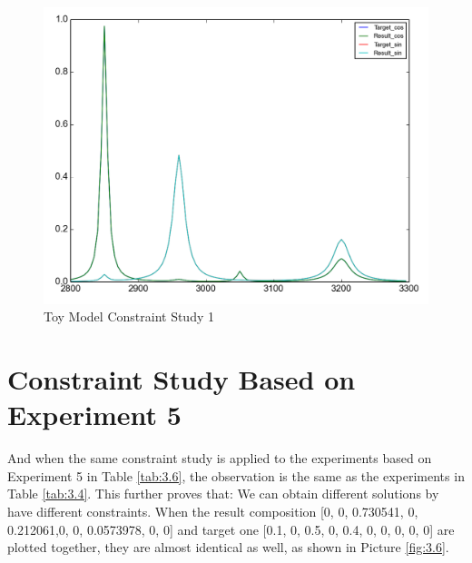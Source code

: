 \begin{figure}[!ht] \label{fig:3.5}
\centering
\includegraphics[scale=0.3]{Figures/toy_model_result_plotting_ir_sin_4candi_constraint_study_experiment4.png} 
\caption{Toy Model Constraint Study 1}
\end{figure}


\section{Constraint Study Based on Experiment 5}

And when the same constraint study is applied to the experiments based on Experiment 5 in Table \ref{tab:3.6}, the observation is the same as the experiments in Table \ref{tab:3.4}. This further proves that: We can obtain different solutions by have different constraints. When the  result composition [0, 0, 0.730541, 0, 0.212061,0, 0, 0.0573978, 0, 0] and target one [0.1, 0, 0.5, 0, 0.4, 0, 0, 0, 0, 0] are plotted together, they are almost identical as well, as shown in Picture \ref{fig:3.6}.

